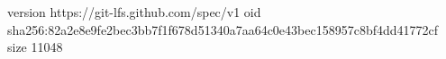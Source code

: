 version https://git-lfs.github.com/spec/v1
oid sha256:82a2e8e9fe2bec3bb7f1f678d51340a7aa64c0e43bec158957c8bf4dd41772cf
size 11048
